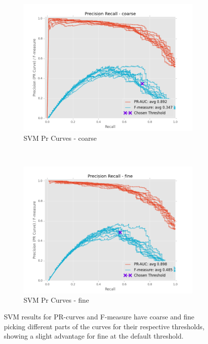 \documentclass[ms]{nuthesis}
\begin{document}
\FloatBarrier
\begin{figure}[!htb]
    \centering
    \begin{subfigure}[t]{0.5\textwidth}
        \centering
        \includegraphics[width=\textwidth]{fig/SVM_FindThreshold_PrCurve_coarse}
        \caption{SVM Pr Curves - coarse}
    \end{subfigure}%
    ~
    \begin{subfigure}[t]{0.5\textwidth}
        \centering
        \includegraphics[width=\textwidth]{fig/SVM_FindThreshold_PrCurve_fine}
        \caption{SVM Pr Curves - fine}
    \end{subfigure}
    \caption{SVM results for PR-curves and F-measure have coarse and fine picking
    different parts of the curves for their respective thresholds, showing a slight
    advantage for fine at the default threshold.}
    \label{fig:SVMThreshPr}
\end{figure}
\FloatBarrier
\end{document}
